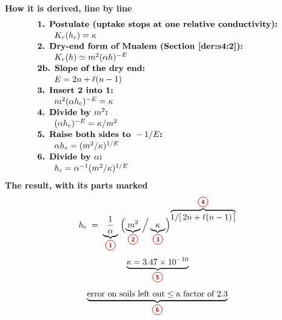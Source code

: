 \begin{keyresult}
\begin{pencil}
{\small\noindent\textbf{How it is derived, line by line}
\[\begin{array}{@{}l@{}}\textbf{1. Postulate (uptake stops at one relative conductivity):}\\[1pt]
\qquad K_r(\hc)=\kappa\\[1pt]
\textbf{2. Dry-end form of Mualem (Section \ref{der:s4:2}):}\\[1pt]
\qquad K_r(h)\simeq m^2(\alpha h)^{-E}\\[1pt]
\textbf{2b. Slope of the dry end:}\\[1pt]
\qquad E=2n+\ell(n-1)\\[1pt]
\textbf{3. Insert 2 into 1:}\\[1pt]
\qquad m^2(\alpha\hc)^{-E}=\kappa\\[1pt]
\textbf{4. Divide by } m^2\textbf{:}\\[1pt]
\qquad (\alpha\hc)^{-E}=\kappa/m^2\\[1pt]
\textbf{5. Raise both sides to } -1/E\textbf{:}\\[1pt]
\qquad \alpha\hc=(m^2/\kappa)^{1/E}\\[1pt]
\textbf{6. Divide by } \alpha\textbf{:}\\[1pt]
\qquad \hc=\alpha^{-1}(m^2/\kappa)^{1/E}
\end{array}\]}
\noindent\textbf{The result, with its parts marked}
\[
\hc\;=\;\underbrace{\frac{1}{\alpha}}_{\circled{1}}\;\Bigl(\underbrace{m^{2}}_{\circled{2}}\Big/\underbrace{\kappa}_{\circled{3}}\Bigr)^{\textstyle\overbrace{1/[\,2n+\ell(n-1)\,]}^{\circled{4}}}
\]
\[
\underbrace{\kappa=3.47\times10^{-10}}_{\circled{5}}\]
\[\underbrace{\text{error on soils left out}\le\text{a factor of }2.3}_{\circled{6}}
\]
\end{pencil}
\end{keyresult}
